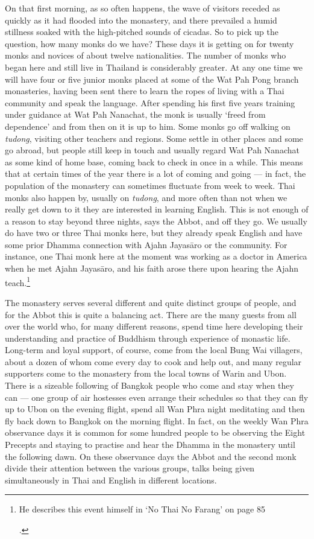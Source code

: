 On that first morning, as so often happens, the wave of visitors receded
as quickly as it had flooded into the monastery, and there prevailed a
humid stillness soaked with the high-pitched sounds of cicadas. So to
pick up the question, how many monks do we have? These days it is
getting on for twenty monks and novices of about twelve nationalities.
The number of monks who began here and still live in Thailand is
considerably greater. At any one time we will have four or five junior
monks placed at some of the Wat Pah Pong branch monasteries, having been
sent there to learn the ropes of living with a Thai community and speak
the language. After spending his first five years training under
guidance at Wat Pah Nanachat, the monk is usually `freed from
dependence' and from then on it is up to him. Some monks go off walking
on \emph{tudong}, visiting other teachers and regions. Some settle in
other places and some go abroad, but people still keep in touch and
usually regard Wat Pah Nanachat as some kind of home base, coming back
to check in once in a while. This means that at certain times of the
year there is a lot of coming and going --- in fact, the population of
the monastery can sometimes fluctuate from week to week. Thai monks also
happen by, usually on \emph{tudong}, and more often than not when we
really get down to it they are interested in learning English. This is
not enough of a reason to stay beyond three nights, says the Abbot, and
off they go. We usually do have two or three Thai monks here, but they
already speak English and have some prior Dhamma connection with Ajahn
Jayasāro or the community. For instance, one Thai monk here at the
moment was working as a doctor in America when he met Ajahn Jayasāro,
and his faith arose there upon hearing the Ajahn teach.\footnote{He
  describes this event himself in `No Thai No Farang' on page 85

  .}

The monastery serves several different and quite distinct groups of
people, and for the Abbot this is quite a balancing act. There are the
many guests from all over the world who, for many different reasons,
spend time here developing their understanding and practice of Buddhism
through experience of monastic life. Long-term and loyal support, of
course, come from the local Bung Wai villagers, about a dozen of whom
come every day to cook and help out, and many regular supporters come to
the monastery from the local towns of Warin and Ubon. There is a
sizeable following of Bangkok people who come and stay when they can ---
one group of air hostesses even arrange their schedules so that they can
fly up to Ubon on the evening flight, spend all Wan Phra night
meditating and then fly back down to Bangkok on the morning flight. In
fact, on the weekly Wan Phra observance days it is common for some
hundred people to be observing the Eight Precepts and staying to
practise and hear the Dhamma in the monastery until the following dawn.
On these observance days the Abbot and the second monk divide their
attention between the various groups, talks being given simultaneously
in Thai and English in different locations.

